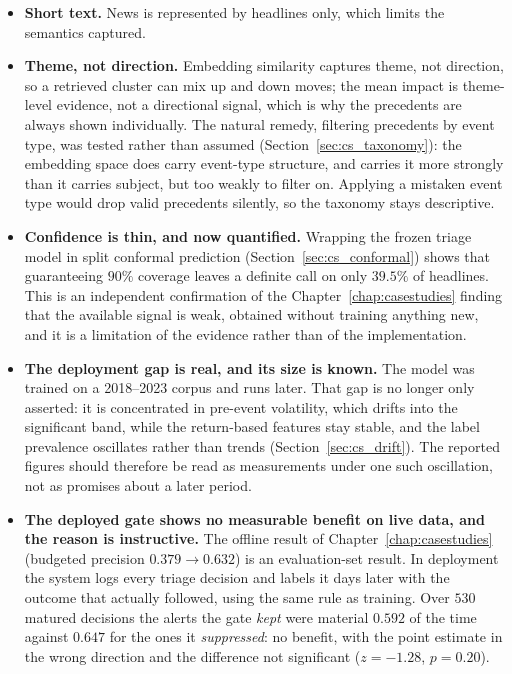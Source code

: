 \begin{itemize}
        also markedly uneven: the worst-covered name reaches only $50\%$ while five names exceed
        $97\%$, and the worst-covered name is simultaneously the one with the highest headline density,
        so its coverage arrives in bursts. The obvious explanation, truncation against the provider's
        per-request ceiling, was tested and rejected: no request window in the corpus came within a
        third of that ceiling.
  \item \textbf{Short text.} News is represented by headlines only, which limits the semantics captured.
  \item \textbf{Theme, not direction.} Embedding similarity captures theme, not direction, so a retrieved
        cluster can mix up and down moves; the mean impact is theme-level evidence, not a directional
        signal, which is why the precedents are always shown individually. The natural remedy, filtering
        precedents by event type, was tested rather than assumed
        (Section~\ref{sec:cs_taxonomy}): the embedding space does carry event-type structure, and
        carries it more strongly than it carries subject, but too weakly to filter on. Applying a
        mistaken event type would drop valid precedents silently, so the taxonomy stays descriptive.
  \item \textbf{Confidence is thin, and now quantified.} Wrapping the frozen triage model in split
        conformal prediction (Section~\ref{sec:cs_conformal}) shows that guaranteeing $90\%$ coverage
        leaves a definite call on only $39.5\%$ of headlines. This is an independent confirmation of the
        Chapter~\ref{chap:casestudies} finding that the available signal is weak, obtained without
        training anything new, and it is a limitation of the evidence rather than of the implementation.
  \item \textbf{The deployment gap is real, and its size is known.} The model was trained on a
        2018--2023 corpus and runs later. That gap is no longer only asserted: it is concentrated in
        pre-event volatility, which drifts into the significant band, while the return-based features
        stay stable, and the label prevalence oscillates rather than trends
        (Section~\ref{sec:cs_drift}). The reported figures should therefore be read as measurements
        under one such oscillation, not as promises about a later period.
  \item \textbf{The deployed gate shows no measurable benefit on live data, and the reason is
        instructive.} The offline result of Chapter~\ref{chap:casestudies} (budgeted precision
        $0.379 \to 0.632$) is an evaluation-set result. In deployment the system logs every triage
        decision and labels it days later with the outcome that actually followed, using the same
        rule as training. Over $530$ matured decisions the alerts the gate \emph{kept} were material
        $0.592$ of the time against $0.647$ for the ones it \emph{suppressed}: no benefit, with the
        point estimate in the wrong direction and the difference not significant
        ($z = -1.28$, $p = 0.20$).


\end{itemize}
